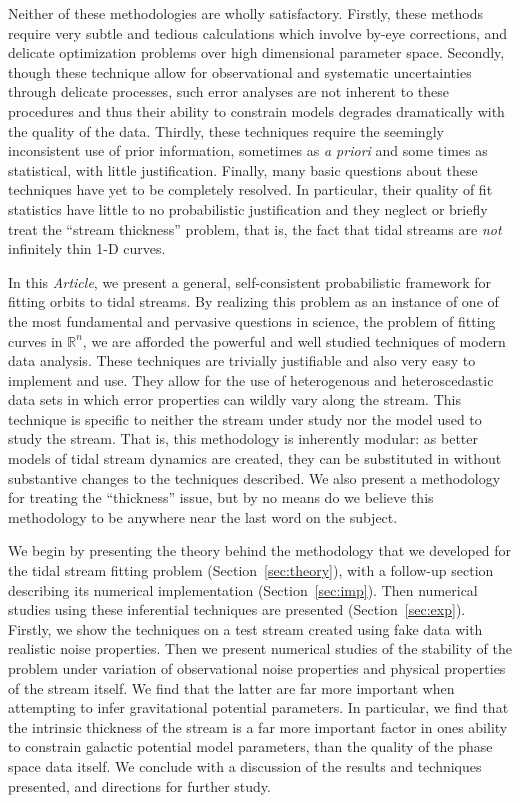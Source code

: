 \documentclass[12pt,preprint]{aastex}
\theoremstyle{plain}
\theoremstyle{definition}
\newcommand{\R}{\mathbb{R}}
\newcommand{\foreign}[1]{\textit{#1}}
\newcommand{\documentname}{\textsl{Article}}
\newcommand{\sectionname}{Section}
\begin{document}
Neither of these methodologies are wholly satisfactory. Firstly, these methods require very subtle and tedious calculations which involve by-eye corrections, and delicate optimization problems over high dimensional parameter space. Secondly, though these technique allow for observational and systematic uncertainties through delicate processes, such error analyses are not inherent to these procedures and thus their ability to constrain models degrades dramatically with the quality of the data.  Thirdly, these techniques require the seemingly inconsistent use of prior information, sometimes as \foreign{a priori} and some times as statistical, with little justification. Finally, many basic questions about these techniques have yet to be completely resolved. In particular, their quality of fit statistics have little to no probabilistic justification and they neglect or briefly treat the ``stream thickness'' problem, that is, the fact that tidal streams are \emph{not} infinitely thin 1-D curves.

In this \documentname, we present a general, self-consistent probabilistic framework for fitting orbits to tidal streams. By realizing this problem as an instance of one of the most fundamental and pervasive questions in science, the problem of fitting curves in $\R^n$, we are afforded the powerful and well studied techniques of modern data analysis. These techniques are trivially justifiable and also very easy to implement and use. They allow for the use of heterogenous and heteroscedastic data sets in which error properties can wildly vary along the stream. This technique is specific to neither the stream under study nor the model used to study the stream. That is, this methodology is inherently modular: as better models of tidal stream dynamics are created, they can be substituted in without substantive changes to the techniques described. We also present a methodology for treating the ``thickness'' issue, but by no means do we believe this methodology to be anywhere near the last word on the subject. 

We begin by presenting the theory behind the methodology that we developed for the tidal stream fitting problem (\sectionname~\ref{sec:theory}), with a follow-up section describing its numerical implementation (\sectionname ~\ref{sec:imp}). Then numerical studies using these inferential techniques are presented (\sectionname ~\ref{sec:exp}). Firstly, we show the techniques on a test stream created using fake data with realistic noise properties. Then we present numerical studies of the stability of the problem under variation of observational noise properties and physical properties of the stream itself. We find that the latter are far more important when attempting to infer gravitational potential parameters. In particular, we find that the intrinsic thickness of the stream is a far more important factor in ones ability to constrain galactic potential model parameters, than the quality of the phase space data itself. We conclude with a discussion of the results and techniques presented, and directions for further study.
\end{document}
